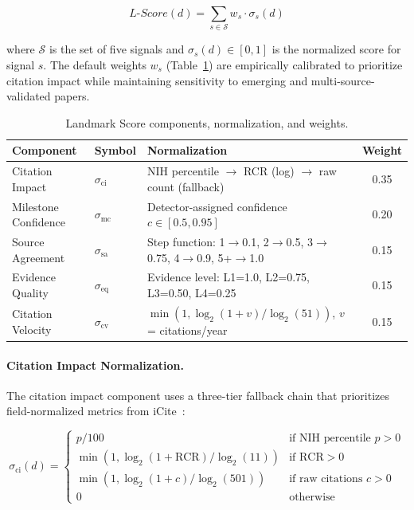 \documentclass[11pt,a4paper]{article}
\newcommand{\lscore}{\textit{L-Score}}
\begin{document}
\begin{equation}
\lscore{}(d) = \sum_{s \in \mathcal{S}} w_s \cdot \sigma_s(d)
\label{eq:lscore}
\end{equation}

where $\mathcal{S}$ is the set of five signals and $\sigma_s(d) \in [0, 1]$ is the normalized score for signal $s$.
The default weights $w_s$ (Table~\ref{tab:lscore_components}) are empirically calibrated to prioritize citation impact while maintaining sensitivity to emerging and multi-source-validated papers.

\begin{table}[htbp]
\centering
\caption{Landmark Score components, normalization, and weights.}
\label{tab:lscore_components}
\begin{tabular}{llp{4.5cm}c}
\toprule
\textbf{Component} & \textbf{Symbol} & \textbf{Normalization} & \textbf{Weight} \\
\midrule
Citation Impact      & $\sigma_{\text{ci}}$  & NIH percentile $\rightarrow$ RCR (log) $\rightarrow$ raw count (fallback) & 0.35 \\
Milestone Confidence & $\sigma_{\text{mc}}$ & Detector-assigned confidence $c \in [0.5, 0.95]$ & 0.20 \\
Source Agreement     & $\sigma_{\text{sa}}$ & Step function: 1$\rightarrow$0.1, 2$\rightarrow$0.5, 3$\rightarrow$0.75, 4$\rightarrow$0.9, 5+$\rightarrow$1.0 & 0.15 \\
Evidence Quality     & $\sigma_{\text{eq}}$ & Evidence level: L1=1.0, L2=0.75, L3=0.50, L4=0.25 & 0.15 \\
Citation Velocity    & $\sigma_{\text{cv}}$ & $\min(1, \log_2(1 + v) / \log_2(51))$, $v$ = citations/year & 0.15 \\
\bottomrule
\end{tabular}
\end{table}

\paragraph{Citation Impact Normalization.}
The citation impact component uses a three-tier fallback chain that prioritizes field-normalized metrics from iCite~\citep{hutchins2016rcr}:

\begin{equation}
\sigma_{\text{ci}}(d) =
\begin{cases}
    p / 100 & \text{if NIH percentile } p > 0 \\
    \min(1, \log_2(1 + \text{RCR}) / \log_2(11)) & \text{if RCR} > 0 \\
    \min(1, \log_2(1 + c) / \log_2(501)) & \text{if raw citations } c > 0 \\
    0 & \text{otherwise}
\end{cases}
\label{eq:citation_impact}
\end{equation}
\end{document}
